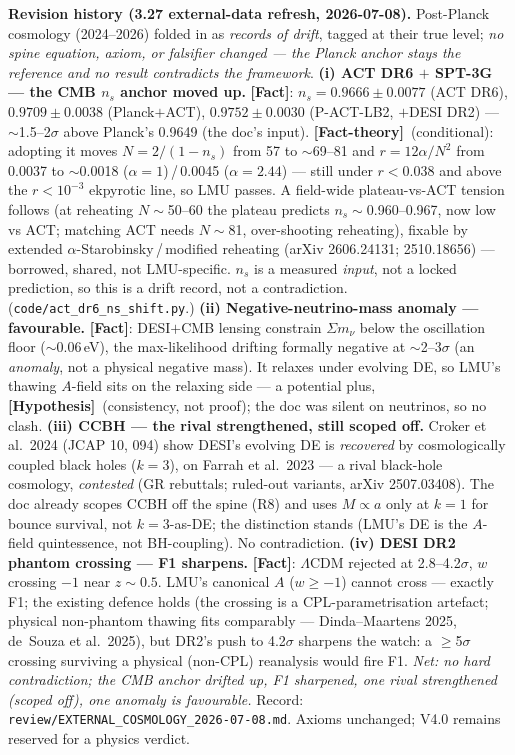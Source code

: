 \documentclass[11pt]{article}
\newcommand{\Fact}{\textbf{\textcolor{green!45!black}{[Fact]}}}
\newcommand{\factth}{\textcolor{green!40!black}{\textbf{[Fact-theory]}}}
\newcommand{\hyp}{\textcolor{orange!80!black}{\textbf{[Hypothesis]}}}
\begin{document}
{\smallskip\noindent\textbf{Revision history (3.27 external-data refresh, 2026-07-08).} Post-Planck cosmology (2024--2026) folded in as \emph{records of drift}, tagged at their true level; \emph{no spine equation, axiom, or falsifier changed --- the Planck anchor stays the reference and no result contradicts the framework}. \textbf{(i) ACT DR6 $+$ SPT-3G --- the CMB $n_s$ anchor moved up.} \Fact: $n_s=0.9666\pm0.0077$ (ACT DR6), $0.9709\pm0.0038$ (Planck$+$ACT), $0.9752\pm0.0030$ (P-ACT-LB2, $+$DESI DR2) --- $\sim$1.5--2$\sigma$ above Planck's 0.9649 (the doc's input). \factth\ (conditional): adopting it moves $N=2/(1-n_s)$ from 57 to $\sim$69--81 and $r=12\alpha/N^2$ from 0.0037 to $\sim$0.0018 ($\alpha{=}1$)\,/\,0.0045 ($\alpha{=}2.44$) --- still under $r<0.038$ and above the $r<10^{-3}$ ekpyrotic line, so LMU passes. A field-wide plateau-vs-ACT tension follows (at reheating $N\sim$50--60 the plateau predicts $n_s\sim$0.960--0.967, now low vs ACT; matching ACT needs $N\sim$81, over-shooting reheating), fixable by extended $\alpha$-Starobinsky\,/\,modified reheating (arXiv 2606.24131; 2510.18656) --- borrowed, shared, not LMU-specific. $n_s$ is a measured \emph{input}, not a locked prediction, so this is a drift record, not a contradiction. (\texttt{code/act\_dr6\_ns\_shift.py}.) \textbf{(ii) Negative-neutrino-mass anomaly --- favourable.} \Fact: DESI$+$CMB lensing constrain $\Sigma m_\nu$ below the oscillation floor ($\sim$0.06\,eV), the max-likelihood drifting formally negative at $\sim$2--3$\sigma$ (an \emph{anomaly}, not a physical negative mass). It relaxes under evolving DE, so LMU's thawing $A$-field sits on the relaxing side --- a potential plus, \hyp\ (consistency, not proof); the doc was silent on neutrinos, so no clash. \textbf{(iii) CCBH --- the rival strengthened, still scoped off.} Croker et al.\ 2024 (JCAP 10, 094) show DESI's evolving DE is \emph{recovered} by cosmologically coupled black holes ($k{=}3$), on Farrah et al.\ 2023 --- a rival black-hole cosmology, \emph{contested} (GR rebuttals; ruled-out variants, arXiv 2507.03408). The doc already scopes CCBH off the spine (R8) and uses $M\!\propto\!a$ only at $k{=}1$ for bounce survival, not $k{=}3$-as-DE; the distinction stands (LMU's DE is the $A$-field quintessence, not BH-coupling). No contradiction. \textbf{(iv) DESI DR2 phantom crossing --- F1 sharpens.} \Fact: $\Lambda$CDM rejected at 2.8--4.2$\sigma$, $w$ crossing $-1$ near $z\!\sim\!0.5$. LMU's canonical $A$ ($w\ge-1$) cannot cross --- exactly F1; the existing defence holds (the crossing is a CPL-parametrisation artefact; physical non-phantom thawing fits comparably --- Dinda--Maartens 2025, de~Souza et al.\ 2025), but DR2's push to 4.2$\sigma$ sharpens the watch: a $\ge$5$\sigma$ crossing surviving a physical (non-CPL) reanalysis would fire F1. \emph{Net: no hard contradiction; the CMB anchor drifted up, F1 sharpened, one rival strengthened (scoped off), one anomaly is favourable.} Record: \texttt{review/EXTERNAL\_COSMOLOGY\_2026-07-08.md}. Axioms unchanged; V4.0 remains reserved for a physics verdict.

}
\end{document}
